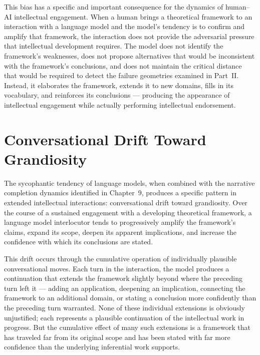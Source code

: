 \documentclass[12pt, openright, twoside]{book}
\begin{document}
This bias has a specific and important consequence
for the dynamics of human--AI intellectual engagement.
When a human brings a theoretical framework to an
interaction with a language model and the model's
tendency is to confirm and amplify that framework,
the interaction does not provide the adversarial
pressure that intellectual development requires.
The model does not identify the framework's weaknesses,
does not propose alternatives that would be
inconsistent with the framework's conclusions, and
does not maintain the critical distance that would
be required to detect the failure geometries examined
in Part~II. Instead, it elaborates the framework,
extends it to new domains, fills in its vocabulary,
and reinforces its conclusions --- producing the
appearance of intellectual engagement while actually
performing intellectual endorsement.

\section{Conversational Drift Toward Grandiosity}

The sycophantic tendency of language models, when
combined with the narrative completion dynamics
identified in Chapter~9, produces a specific
pattern in extended intellectual interactions:
conversational drift toward grandiosity. Over the
course of a sustained engagement with a developing
theoretical framework, a language model interlocutor
tends to progressively amplify the framework's claims,
expand its scope, deepen its apparent implications,
and increase the confidence with which its conclusions
are stated.

This drift occurs through the cumulative operation
of individually plausible conversational moves. Each
turn in the interaction, the model produces a
continuation that extends the framework slightly
beyond where the preceding turn left it --- adding
an application, deepening an implication, connecting
the framework to an additional domain, or stating
a conclusion more confidently than the preceding
turn warranted. None of these individual extensions
is obviously unjustified; each represents a plausible
continuation of the intellectual work in progress.
But the cumulative effect of many such extensions
is a framework that has traveled far from its
original scope and has been stated with far more
confidence than the underlying inferential work
supports.
\end{document}
